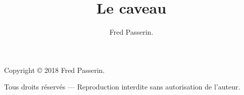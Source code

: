 \documentclass[a4paper,12pt,extrafontsizes,twoside]{memoir}
\title{Le caveau}
\author{Fred Passerin.}
\date{}
\begin{document}
\maketitle


Copyright \copyright{} 2018 Fred Passerin.

\vspace{\baselineskip}
Tous droits réservés — Reproduction interdite sans autorisation de l'auteur.
\thispagestyle{empty}

\frontmatter



\mainmatter








%

\backmatter




\tableofcontents
\end{document}
